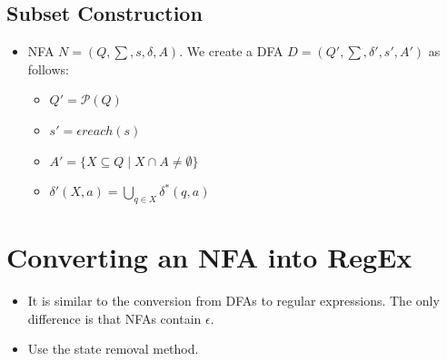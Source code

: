 \subsection{Subset Construction}
\begin{itemize}
    \item NFA $N = (Q, \sum, s, \delta, A)$. We create a DFA $D = (Q', \sum, \delta', s', A')$ as follows:
    \begin{itemize}
        \item $Q' = \mathcal{P}(Q)$
        \item $s' = \epsilon reach(s)$
        \item $A' = \{ X \subseteq Q \mid X \cap A \neq \emptyset \}$
        \item $\delta'(X, a) = \bigcup_{q \in X} \delta^{\ast}(q, a)$
    \end{itemize}
\end{itemize}

\section{Converting an NFA into RegEx}
\begin{itemize}
    \item It is similar to the conversion from DFAs to regular expressions. The only difference is that NFAs contain $\epsilon$.
    \item Use the state removal method.
\end{itemize}
